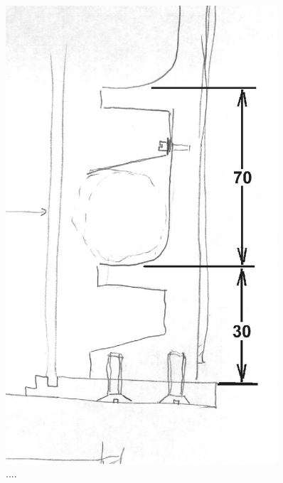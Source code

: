 \documentclass[11pt,a4paper]{article}
\begin{document}
 \begin{figure}[h]
    	\mbox{\includegraphics[width=0.9\textwidth]{figures/Buridan_assay-04.eps}}
 	\caption{....}
  	\label{fig:buridan-04}
 \end{figure}
\end{document}
